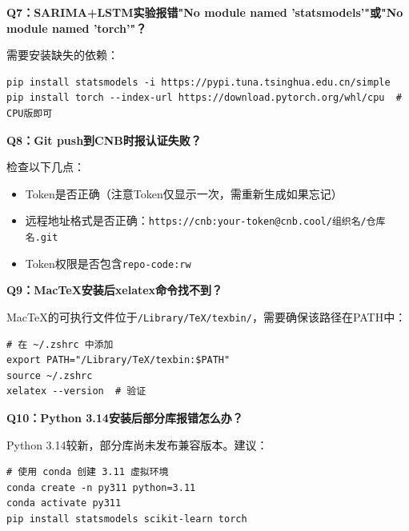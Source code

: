 \textbf{Q7：SARIMA+LSTM实验报错"No module named 'statsmodels'"或"No module named 'torch'"？}

需要安装缺失的依赖：

\begin{lstlisting}[style=shell]
pip install statsmodels -i https://pypi.tuna.tsinghua.edu.cn/simple
pip install torch --index-url https://download.pytorch.org/whl/cpu  # CPU版即可
\end{lstlisting}

\textbf{Q8：Git push到CNB时报认证失败？}

检查以下几点：
\begin{itemize}[leftmargin=2em]
  \item Token是否正确（注意Token仅显示一次，需重新生成如果忘记）
  \item 远程地址格式是否正确：\texttt{https://cnb:your-token@cnb.cool/组织名/仓库名.git}
  \item Token权限是否包含\texttt{repo-code:rw}
\end{itemize}

\textbf{Q9：MacTeX安装后xelatex命令找不到？}

MacTeX的可执行文件位于\texttt{/Library/TeX/texbin/}，需要确保该路径在PATH中：

\begin{lstlisting}[style=shell]
# 在 ~/.zshrc 中添加
export PATH="/Library/TeX/texbin:$PATH"
source ~/.zshrc
xelatex --version  # 验证
\end{lstlisting}

\textbf{Q10：Python 3.14安装后部分库报错怎么办？}

Python 3.14较新，部分库尚未发布兼容版本。建议：

\begin{lstlisting}[style=shell]
# 使用 conda 创建 3.11 虚拟环境
conda create -n py311 python=3.11
conda activate py311
pip install statsmodels scikit-learn torch
\end{lstlisting}
